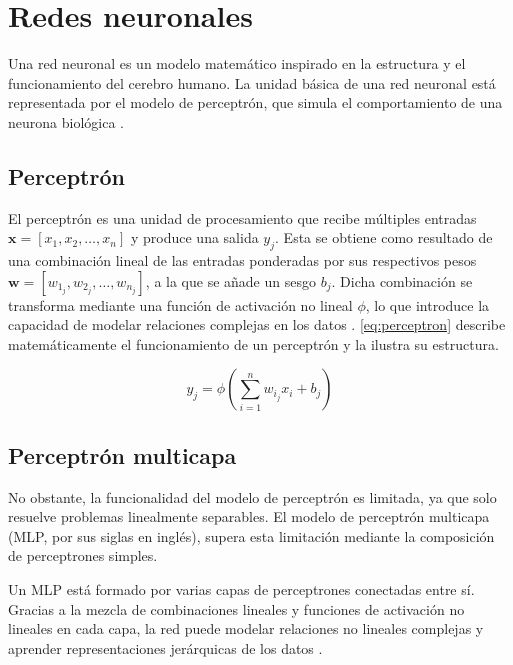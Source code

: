 \section{Redes neuronales}
\label{sec:redes_neuronales}
Una red neuronal es un modelo matemático inspirado en la estructura y el funcionamiento del cerebro humano. La unidad básica de una red neuronal está representada por el modelo de perceptrón, que simula el comportamiento de una neurona biológica \cite{rosenblatt1958perceptron}.

\subsection{Perceptrón}
\label{sec:perceptron}

El perceptrón \cite{rosenblatt1958perceptron} es una unidad de procesamiento que recibe múltiples entradas $\mathbf{x} = [x_1, x_2, \ldots, x_n]$ y produce una salida $y_j$. Esta se obtiene como resultado de una combinación lineal de las entradas ponderadas por sus respectivos pesos $\mathbf{w} = [w_{1_j}, w_{2_j}, \ldots, w_{n_j}]$, a la que se añade un sesgo $b_j$. Dicha combinación se transforma mediante una función de activación no lineal $\phi$, lo que introduce la capacidad de modelar relaciones complejas en los datos \cite{cybenko1989approximation}. \eqref{eq:perceptron} describe matemáticamente el funcionamiento de un perceptrón y la  ilustra su estructura.

\begin{equation}
    \label{eq:perceptron}
    y_j = \phi\left(\sum_{i=1}^{n} w_{i_j} x_i + b_j\right)
\end{equation}

% 

\subsection{Perceptrón multicapa}
\label{sec:perceptron_multicapa}

No obstante, la funcionalidad del modelo de perceptrón es limitada, ya que solo resuelve problemas linealmente separables. El modelo de perceptrón multicapa (MLP, por sus siglas en inglés), supera esta limitación mediante la composición de perceptrones simples.

Un MLP está formado por varias capas de perceptrones conectadas entre sí. Gracias a la mezcla de combinaciones lineales y funciones de activación no lineales en cada capa, la red puede modelar relaciones no lineales complejas y aprender representaciones jerárquicas de los datos \cite{cybenko1989approximation}.

